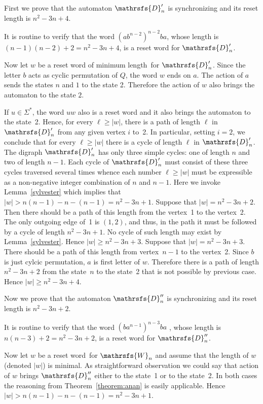 \documentclass[11pt]{llncs}
\newcommand{\sw}{reset word}
\newcommand{\ssw}{reset word of minimum length}
\begin{document}
First we prove that the automaton $\mathrsfs{D}'_n$ is synchronizing
and its reset length is $n^2-3n+4$.

It is routine to verify that the word $(ab^{n - 2})^{n - 2}ba$, whose length
is $(n - 1)(n - 2) + 2 = n^2 -3n + 4$, is a reset word for $\mathrsfs{D}'_n$.

Now let $w$ be a \ssw\ for $\mathrsfs{D}'_n$. Since the letter $b$ acts
as cyclic permutation of $Q$,  the word $w$ ends on $a$. The action of $a$
sends the states $n$ and $1$ to the state 2. Therefore the action of $w$
also brings the automaton to the state $2$.

If $u\in\Sigma^*$, the word $uw$ also is a reset word and it also
brings the automaton to the state~2. Hence, for every $\ell\ge|w|$,
there is a path of length $\ell$ in $\mathrsfs{D}'_n$ from any given vertex $i$
to~2. In particular, setting $i=2$, we conclude that for every
$\ell\ge|w|$ there is a cycle of length $\ell$ in $\mathrsfs{D}'_n$. The digraph
$\mathrsfs{D}'_n$ has only three simple cycles: one of length $n$ and two of length $n-1$.
Each cycle of $\mathrsfs{D}'_n$ must consist of these three cycles traversed several times
whence each number $\ell\ge|w|$ must be expressible as a non-negative integer
combination of $n$ and $n-1$. Here we invoke Lemma~\ref{sylvester} which
implies that $|w|>n(n-1)-n-(n-1)=n^2-3n+1$. Suppose that $|w|=n^2-3n+2$.
Then there should be a path of this length from the vertex~1 to the vertex~2.
The only outgoing edge of~1 is $(1,2)$, and thus, in the path it must be
followed by a cycle of length $n^2-3n+1$. No cycle of such length may
exist by  Lemma~\ref{sylvester}. Hence $|w|\ge n^2-3n+3$.
Suppose that $|w|=n^2-3n+3$. There should be a path of this length from vertex~$n - 1$ to the
vertex~2. Since $b$ is just cylcic permutation, $a$ is first letter of $w$.
Therefore there is a path of length $n^2-3n+2$ from the state~$n$ to the state~2 that
is not possible by previous case. Hence $|w|\ge n^2-3n+4$.

\medskip

Now we prove that the automaton $\mathrsfs{D}''_n$ is synchronizing and
its reset length is $n^2-3n+2$.

It is routine to verify that the word $(ba^{n - 1})^{n - 3}ba$ , whose length
is $n(n - 3) + 2 = n^2 -3n + 2$, is a reset word for $\mathrsfs{D}''_n$.

Now let $w$ be a \sw\ for $\mathrsfs{W}_n$ and assume that the length
of $w$ (denoted $|w|$) is minimal.
As straightforward observation we could say that action of $w$ brings
$\mathrsfs{D}''_n$ either to the state~1 or to the state~2. In both cases
the reasoning from Theorem~\ref{theorem:anan} is easily applicable.
Hence $|w|>n(n-1)-n-(n-1)=n^2-3n+1$.
\end{document}
